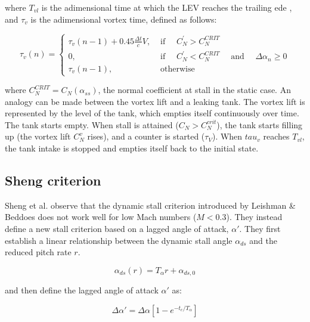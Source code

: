 \noindent where $T_{vl}$ is the adimensional time at which the LEV reaches the trailing ede \cite{leishman_semi-empirical_1989}, and $\tau_v$ is the adimensional vortex time, defined as follows: 

\begin{equation}
	\tau_{v}(n)=\left\{\begin{array}{ll}
		\tau_{v}(n-1)+0.45 \frac{\Delta t}{c} V, & \text { if } \quad C_N^{\prime}>C_{N}^{CRIT} \\
		0, & \text { if } \quad C_N^{\prime}<C_{N}^{CRIT} \quad \text { and } \quad \Delta \alpha_{n} \geq 0 \\
		\tau_{v}(n-1), & \text { otherwise }
		\end{array}\right.
	\label{eq:adim_vortex_time}	
\end{equation}

\noindent where $C_N^{CRIT}=C_N(\alpha_{ss})$, the normal coefficient at stall in the static case. An analogy can be made between the vortex lift and a leaking tank. The vortex lift is represented by the level of the tank, which empties itself continuously over time. The tank starts empty. When stall is attained ($C_N>C_N^{crit}$), the tank starts filling up (the vortex lift $C_N^v$ rises), and a counter is started ($\tau_V$). When $tau_v$ reaches $T_{vl}$, the tank intake is stopped and empties itself back to the initial state. 

\subsection{Sheng criterion}
\label{section:sheng_criterion}
Sheng et al. observe \cite{sheng_new_2006} that the dynamic stall criterion introduced by Leishman \& Beddoes does not work well for low Mach numbers ($M<0.3$). They instead define a new stall criterion based 
on a lagged angle of attack, $\alpha'$. They first establish a linear relationship between the dynamic stall angle $\alpha_{ds}$ and the reduced pitch rate $r$. 

\begin{equation}
	\alpha_{ds}(r) = T_\alpha r+\alpha_{ds,0}
	\label{eq:linfit}
\end{equation}

\noindent and then define the lagged angle of attack $\alpha'$ as:

\begin{equation}
\Delta \alpha' = \Delta \alpha\left[1-e^{-t_c/T_\alpha} \right]
\label{eq:alpha_lag}
\end{equation}


